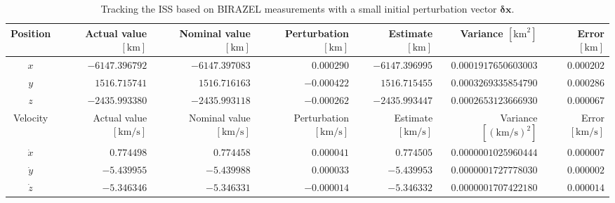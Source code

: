 \documentclass[conference]{IEEEtran}
\begin{document}
\begin{table}[t]
	\caption[BIRAZEL-based ISS tracking with an initial perturbation vector]{Tracking the ISS based on BIRAZEL measurements with a small initial perturbation vector $\mathbf{\delta}\mathbf{x}$.} \label{table:od2:birazel:small}
	\centering
	
		\begin{tabular}{c | r | r | r | r | r |r}
			\hline 
			Position & Actual value $[\mathrm{km}]$ & Nominal value $[\mathrm{km}]$ & Perturbation $[\mathrm{km}]$ & Estimate $[\mathrm{km}]$ & Variance $[\mathrm{km}^2]$ & Error $[\mathrm{km}]$ \\
			\hline \hline
					$x$ & $-6147.396792$ & $-6147.397083$ & $0.000290$ & $-6147.396995$ & $0.0001917650603003$ & $0.000202$ \\
			$y$ &  $1516.715741$ &  $1516.716163$ &$-0.000422$ &  $1516.715455$ & $0.0003269335854790$ & $0.000286$ \\
			$z$ & $-2435.993380$ & $-2435.993118$ & $-0.000262$ & $-2435.993447$ & $0.0002653123666930 $ & $0.000067$ \\
			\hline
			Velocity & Actual value $[\mathrm{km/s}]$ & Nominal value $[\mathrm{km/s}]$ & Perturbation $[\mathrm{km/s}]$ & Estimate $[\mathrm{km/s}]$ & Variance $[(\mathrm{km/s})^2]$ & Error $[\mathrm{km/s}]$ \\
			\hline \hline
			$\dot{x}$ & $0.774498$ & $0.774458$ & $0.000041$ & $0.774505$ & $0.0000001025960444$ & $0.000007$ \\
			$\dot{y}$ & $-5.439955$ & $-5.439988$ & $0.000033$ & $-5.439953$ & $0.0000001727778030$ & $0.000002$ \\
			$\dot{z}$ & $-5.346346$ & $-5.346331$ & $-0.000014$ & $-5.346332$ & $0.0000001707422180$ & $0.000014$\\
			\hline
		\end{tabular}%
	
\end{table}
\end{document}

